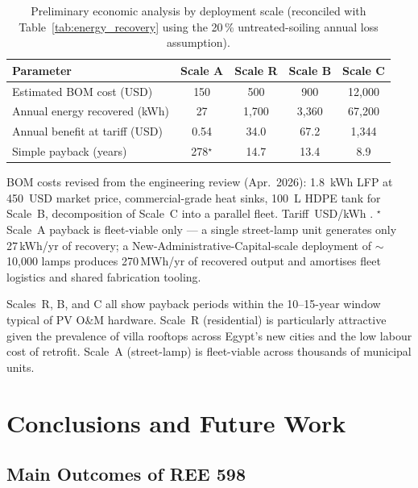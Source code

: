 \documentclass[12pt,a4paper]{report}
\numberwithin{equation}{chapter}
\numberwithin{figure}{chapter}
\numberwithin{table}{chapter}
\begin{document}
\begin{table}[H]
\centering
\caption{Preliminary economic analysis by deployment scale (reconciled with Table~\ref{tab:energy_recovery} using the 20\,\% untreated-soiling annual loss assumption).}
\label{tab:economics}
\begin{tabular}{lcccc}
\toprule
\textbf{Parameter}                & \textbf{Scale A} & \textbf{Scale R} & \textbf{Scale B} & \textbf{Scale C} \\
\midrule
Estimated BOM cost (USD)          & 150      & 500      & 900      & 12{,}000 \\
Annual energy recovered (kWh)     & 27       & 1{,}700  & 3{,}360  & 67{,}200 \\
Annual benefit at tariff (USD)    & 0.54     & 34.0     & 67.2     & 1{,}344 \\
Simple payback (years)            & 278$^\star$ & 14.7 & 13.4     & 8.9 \\
\bottomrule
\end{tabular}
\vspace{0.25em}
\par\noindent\footnotesize BOM costs revised from the engineering review (Apr.\ 2026): 1.8~kWh LFP at 450~USD market price, commercial-grade heat sinks, 100~L HDPE tank for Scale~B, decomposition of Scale~C into a parallel fleet. Tariff \TariffUSD\,USD/kWh \cite{egyptera_tariff}. $^\star$Scale~A payback is fleet-viable only --- a single street-lamp unit generates only 27\,kWh/yr of recovery; a New-Administrative-Capital-scale deployment of $\sim$10{,}000 lamps produces 270\,MWh/yr of recovered output and amortises fleet logistics and shared fabrication tooling. \normalsize
\end{table}

\noindent Scales~R, B, and C all show payback periods within the 10--15-year window
typical of PV O\&M hardware. Scale~R (residential) is particularly attractive given
the prevalence of villa rooftops across Egypt's new cities and the low labour cost of
retrofit. Scale~A (street-lamp) is fleet-viable across thousands of municipal units.

\chapter{Conclusions and Future Work}

\section{Main Outcomes of REE 598}
\end{document}
